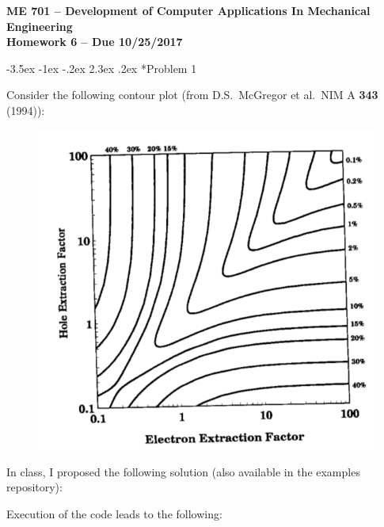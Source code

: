 \documentclass[11pt]{article}
\makeatletter
\renewcommand\section{\@startsection{section}{1}{\z@}%
                                  {-3.5ex \@plus -1ex \@minus -.2ex}%
                                  {2.3ex \@plus.2ex}%
                                  {\normalfont\bfseries}}
\makeatother
\begin{document}
{\large
  \begin{center}
    {\bf ME 701 -- Development of Computer Applications In Mechanical Engineering \\ 
         Homework 6  -- Due 10/25/2017 \\
    }
  \end{center}

\setlength{\unitlength}{1in}

}

\vspace{12pt}







\section*{Problem 1}

Consider the following contour plot (from D.S.~McGregor et al.~NIM A {\bf 343} (1994)):

\begin{figure}[ht]
    \centering
    \includegraphics[keepaspectratio, width = 3.0 in]
                    {original_contour}
\end{figure}

In class, I proposed the following solution (also available in the 
examples repository):



Execution of the code leads to the following:
\end{document}
